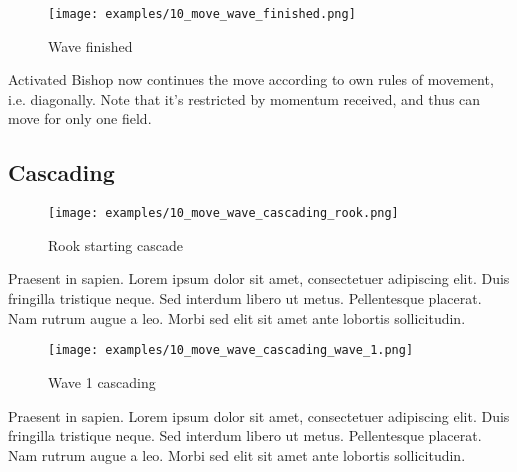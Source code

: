 \clearpage %

\noindent
\begin{figure}[h]
\texttt{[image: examples/10\_move\_wave\_finished.png]}
\caption{Wave finished}
\label{fig:10_move_wave_finished}
\end{figure}

Activated Bishop now continues the move according to own rules of movement,
i.e. diagonally. Note that it's restricted by momentum received, and thus
can move for only one field.

\clearpage %

\subsection*{Cascading}


\noindent
\begin{wrapfigure}[10]{l}{0.5625\textwidth}
\texttt{[image: examples/10\_move\_wave\_cascading\_rook.png]}
\caption{Rook starting cascade}
\label{fig:10_move_wave_cascading_rook}
\end{wrapfigure}
Praesent in sapien. Lorem ipsum dolor sit amet, consectetuer adipiscing elit.
Duis fringilla tristique neque. Sed interdum libero ut metus. Pellentesque placerat.
Nam rutrum augue a leo. Morbi sed elit sit amet ante lobortis sollicitudin.

\vspace*{0.15\textheight}
\noindent
\begin{wrapfigure}[10]{r}{0.5625\textwidth}
\texttt{[image: examples/10\_move\_wave\_cascading\_wave\_1.png]}
\caption{Wave 1 cascading}
\label{fig:10_move_wave_cascading_wave_1}
\end{wrapfigure}
Praesent in sapien. Lorem ipsum dolor sit amet, consectetuer adipiscing elit.
Duis fringilla tristique neque. Sed interdum libero ut metus. Pellentesque placerat.
Nam rutrum augue a leo. Morbi sed elit sit amet ante lobortis sollicitudin.

